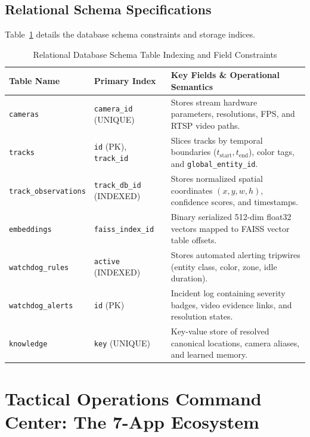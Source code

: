 \documentclass[12pt,a4paper]{article}
\begin{document}
\subsection{Relational Schema Specifications}
Table~\ref{tab:schemaspec} details the database schema constraints and storage indices.

\begin{table}[htbp]
\centering
\caption{Relational Database Schema Table Indexing and Field Constraints}
\label{tab:schemaspec}
\fontsize{10pt}{12pt}\selectfont
\begin{tabularx}{\textwidth}{llX}
\toprule
\textbf{Table Name} & \textbf{Primary Index} & \textbf{Key Fields \& Operational Semantics} \\
\midrule
\texttt{cameras} & \texttt{camera\_id} (UNIQUE) & Stores stream hardware parameters, resolutions, FPS, and RTSP video paths. \\
\texttt{tracks} & \texttt{id} (PK), \texttt{track\_id} & Slices tracks by temporal boundaries ($t_{\text{start}}, t_{\text{end}}$), color tags, and \texttt{global\_entity\_id}. \\
\texttt{track\_observations} & \texttt{track\_db\_id} (INDEXED) & Stores normalized spatial coordinates $(x,y,w,h)$, confidence scores, and timestamps. \\
\texttt{embeddings} & \texttt{faiss\_index\_id} & Binary serialized 512-dim float32 vectors mapped to FAISS vector table offsets. \\
\texttt{watchdog\_rules} & \texttt{active} (INDEXED) & Stores automated alerting tripwires (entity class, color, zone, idle duration). \\
\texttt{watchdog\_alerts} & \texttt{id} (PK) & Incident log containing severity badges, video evidence links, and resolution states. \\
\texttt{knowledge} & \texttt{key} (UNIQUE) & Key-value store of resolved canonical locations, camera aliases, and learned memory. \\
\bottomrule
\end{tabularx}
\end{table}

\section{Tactical Operations Command Center: The 7-App Ecosystem}
\end{document}
